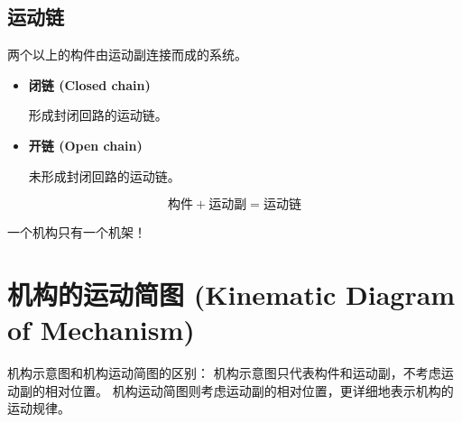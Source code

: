 \subsection{运动链}
\begin{definition}
    两个以上的构件由运动副连接而成的系统。
\end{definition}

\begin{itemize}
    \item \textbf{闭链 (Closed chain)}
    \begin{definition}
        形成封闭回路的运动链。
\end{definition}
    \item \textbf{开链 (Open chain)}
    \begin{definition}
        未形成封闭回路的运动链。
\end{definition}
\end{itemize}
\[
\text{构件} + \text{运动副} = \text{运动链}
\]
\begin{remark}
    一个机构只有一个机架！
\end{remark}

\section{机构的运动简图 (Kinematic Diagram of Mechanism)}
\begin{remark}
    机构示意图和机构运动简图的区别：
    机构示意图只代表构件和运动副，不考虑运动副的相对位置。
    机构运动简图则考虑运动副的相对位置，更详细地表示机构的运动规律。
\end{remark}
